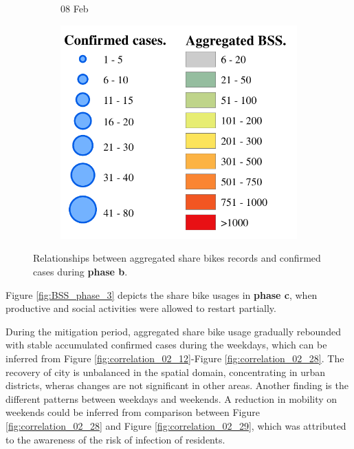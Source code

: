 \documentclass[ijgi,submit,moreauthors,pdftex]{Definitions/mdpi}
\begin{document}
\begin{figure}[!h]
\begin{subfigure}{.3\textwidth}
\begin{tikzpicture}[inner sep = 0pt]
        \end{tikzpicture}
        \caption{08 Feb}
    \end{subfigure}
    \begin{subfigure}{.3\textwidth}
        \includegraphics[width=\textwidth]{Figures/Relation_with_confrimed_cases/legend7-eps-converted-to.pdf}
    \end{subfigure}
    \caption{Relationships between aggregated share bikes records and confirmed cases during \textbf{phase b}.}
    \label{fig:BSS_phase1_2}
\end{figure}

Figure \ref{fig:BSS_phase_3} depicts the share bike usages in \textbf{phase c}, when productive and social activities were allowed to restart partially.

During the mitigation period, aggregated share bike usage gradually rebounded with stable accumulated confirmed cases during the weekdays, which can be inferred from Figure \ref{fig:correlation_02_12}-Figure \ref{fig:correlation_02_28}.
The recovery of city is unbalanced in the spatial domain, concentrating in urban districts, wheras changes are not significant in other areas.
Another finding is the different patterns between weekdays and weekends.
A reduction in mobility on weekends could be inferred from comparison between Figure \ref{fig:correlation_02_28} and Figure \ref{fig:correlation_02_29}, which was attributed to the awareness of the risk of infection of residents.
\end{document}
